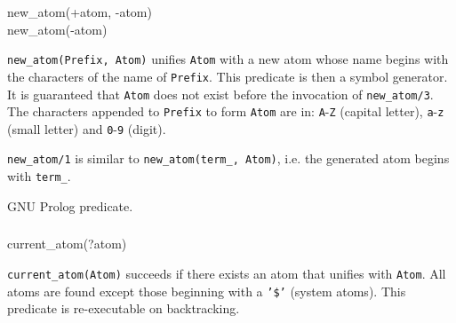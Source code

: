 \begin{TemplatesOneCol}
new\_atom(+atom, -atom)\\
new\_atom(-atom)

\end{TemplatesOneCol}

\Description

\texttt{new\_atom(Prefix, Atom)} unifies \texttt{Atom} with a new atom
whose name begins with the characters of the name of \texttt{Prefix}. 
This predicate is then a symbol generator. It is guaranteed that \texttt{Atom} does not exist
before the invocation of \texttt{new\_atom/3}. The characters appended to
\texttt{Prefix} to form \texttt{Atom} are in: \texttt{A}-\texttt{Z} (capital
letter), \texttt{a}-\texttt{z} (small letter) and \texttt{0}-\texttt{9}
(digit).

\texttt{new\_atom/1} is similar to \texttt{new\_atom(term\_, Atom)}, i.e.
the generated atom begins with \texttt{term\_}.

\begin{PlErrors}




\end{PlErrors}

\Portability

GNU Prolog predicate.

\subsubsection{\label{current-atom/2}}

\begin{TemplatesOneCol}
current\_atom(?atom)

\end{TemplatesOneCol}

\Description

\texttt{current\_atom(Atom)} succeeds if there exists an atom that unifies
with \texttt{Atom}. All atoms are found except those beginning with a
\texttt{'\$'} (system atoms). This predicate is re-executable on
backtracking.

\begin{PlErrors}


\end{PlErrors}

